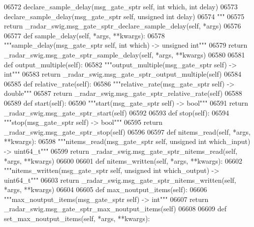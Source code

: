 \begin{DoxyCode}
{{{{{{{{{{{{{{{{{{{{{{06572 \textcolor{stringliteral}{        declare\_sample\_delay(msg\_gate\_sptr self, int which, int delay)}
06573 \textcolor{stringliteral}{        declare\_sample\_delay(msg\_gate\_sptr self, unsigned int delay)}
06574 \textcolor{stringliteral}{        """}
06575         \textcolor{keywordflow}{return} \_radar\_swig.msg\_gate\_sptr\_declare\_sample\_delay(self, *args)
06576 
06577     \textcolor{keyword}{def }sample_delay(self, *args, **kwargs):
06578         \textcolor{stringliteral}{"""sample\_delay(msg\_gate\_sptr self, int which) -> unsigned int"""}
06579         \textcolor{keywordflow}{return} \_radar\_swig.msg\_gate\_sptr\_sample\_delay(self, *args, **kwargs)
06580 
06581     \textcolor{keyword}{def }output_multiple(self):
06582         \textcolor{stringliteral}{"""output\_multiple(msg\_gate\_sptr self) -> int"""}
06583         \textcolor{keywordflow}{return} \_radar\_swig.msg\_gate\_sptr\_output\_multiple(self)
06584 
06585     \textcolor{keyword}{def }relative_rate(self):
06586         \textcolor{stringliteral}{"""relative\_rate(msg\_gate\_sptr self) -> double"""}
06587         \textcolor{keywordflow}{return} \_radar\_swig.msg\_gate\_sptr\_relative\_rate(self)
06588 
06589     \textcolor{keyword}{def }start(self):
06590         \textcolor{stringliteral}{"""start(msg\_gate\_sptr self) -> bool"""}
06591         \textcolor{keywordflow}{return} \_radar\_swig.msg\_gate\_sptr\_start(self)
06592 
06593     \textcolor{keyword}{def }stop(self):
06594         \textcolor{stringliteral}{"""stop(msg\_gate\_sptr self) -> bool"""}
06595         \textcolor{keywordflow}{return} \_radar\_swig.msg\_gate\_sptr\_stop(self)
06596 
06597     \textcolor{keyword}{def }nitems_read(self, *args, **kwargs):
06598         \textcolor{stringliteral}{"""nitems\_read(msg\_gate\_sptr self, unsigned int which\_input) -> uint64\_t"""}
06599         \textcolor{keywordflow}{return} \_radar\_swig.msg\_gate\_sptr\_nitems\_read(self, *args, **kwargs)
06600 
06601     \textcolor{keyword}{def }nitems_written(self, *args, **kwargs):
06602         \textcolor{stringliteral}{"""nitems\_written(msg\_gate\_sptr self, unsigned int which\_output) -> uint64\_t"""}
06603         \textcolor{keywordflow}{return} \_radar\_swig.msg\_gate\_sptr\_nitems\_written(self, *args, **kwargs)
06604 
06605     \textcolor{keyword}{def }max_noutput_items(self):
06606         \textcolor{stringliteral}{"""max\_noutput\_items(msg\_gate\_sptr self) -> int"""}
06607         \textcolor{keywordflow}{return} \_radar\_swig.msg\_gate\_sptr\_max\_noutput\_items(self)
06608 
06609     \textcolor{keyword}{def }set_max_noutput_items(self, *args, **kwargs):
}}}}}}}}}}}}}}}}}}}}}}
\end{DoxyCode}
